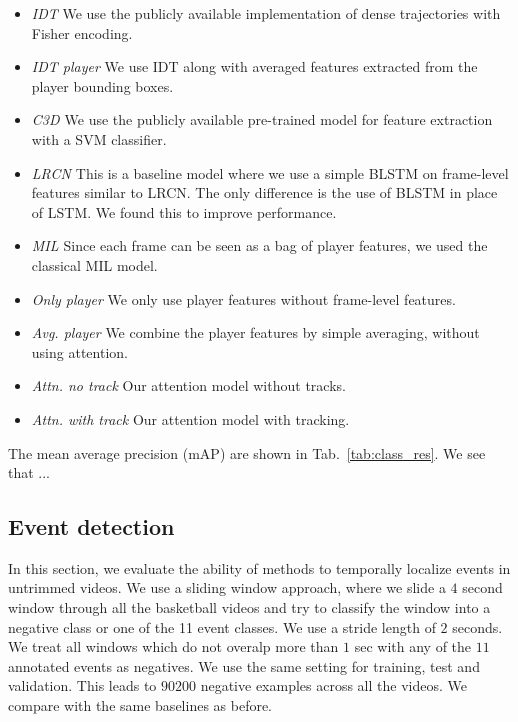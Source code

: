 \begin{itemize}
  \item \emph{IDT\cite{Wang_CVPR11}} We use the publicly available implementation of dense trajectories with
  Fisher encoding.
  
  \item \emph{IDT\cite{Wang_CVPR11} player} We use IDT along with averaged features extracted from the player
  bounding boxes.

  \item \emph{C3D \cite{Tran_arxiv14}} We use the publicly available pre-trained model for feature extraction
  with a SVM classifier.

  \item \emph{LRCN \cite{Donahue_arxiv14}} This is a baseline model where we use a simple BLSTM on frame-level features similar
  to LRCN. The only difference is the use of BLSTM in place of LSTM. We found this to improve
  performance.

  \item \emph{MIL \cite{}} Since each frame can be seen as a bag of player features, we used the
  classical MIL model. 

  \item \emph{Only player} We only use player features without frame-level
  features.
 
  \item \emph{Avg. player} We combine the player features by simple averaging, without
using  attention.

  \item \emph{Attn. no track} Our attention model without tracks.

  \item \emph{Attn. with track} Our attention model with tracking.
\end{itemize}

The mean average precision (mAP)
are shown in Tab.~\ref{tab:class_res}. We see that ...


\subsection{Event detection}

In this section, we evaluate the ability of methods to temporally localize events in untrimmed videos.
We use a sliding window approach, where we slide a $4$ second window
through all the basketball videos and try to classify the window into a negative
class or one of the 11 event classes. We use a stride length of $2$ seconds.
We treat all windows which do not overalp more than $1$ sec with any of the $11$ annotated
events as negatives. We use the same setting for training, test and validation.
This leads to $90200$ negative examples across all the videos.
 We compare with the same baselines as before.

